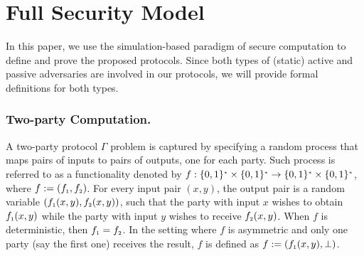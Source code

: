 

\section{Full Security Model}\label{sec::sec-model-long}

In this paper, we use the simulation-based paradigm of secure computation \cite{DBLP:books/cu/Goldreich2004} to define and prove the proposed protocols. Since both types of (static) active and passive adversaries are involved in our protocols, we will provide formal definitions for both types. 
%
 
 \vs 
 
 \subsubsection{Two-party Computation.} A two-party protocol $\Gamma$ problem is captured by specifying a random process that maps pairs of inputs to pairs of outputs, one for each party. Such process is referred to as a functionality denoted by  $f:\{0,1\}^{\scriptscriptstyle *}\times\{0,1\}^{\scriptscriptstyle *}\rightarrow\{0,1\}^{\scriptscriptstyle *}\times\{0,1\}^{\scriptscriptstyle *}$, where $f:=(f_{\scriptscriptstyle 1},f_{\scriptscriptstyle 2})$. For every input pair $(x,y)$, the output pair is a random variable $(f_{\scriptscriptstyle 1} (x,y), f_{\scriptscriptstyle 2} (x,y))$, such that the party with input $x$ wishes to obtain $f_{\scriptscriptstyle 1} (x,y)$ while the party with input $y$ wishes to receive $f_{\scriptscriptstyle 2} (x,y)$. When $f$ is deterministic, then $f_{\scriptscriptstyle 1} =f_{\scriptscriptstyle 2}$. In the setting where $f$ is asymmetric and only one party (say the first one) receives the result, $f$ is defined as $f:=(f_{\scriptscriptstyle 1}(x,y), \bot)$. 
 
 \vs
 
